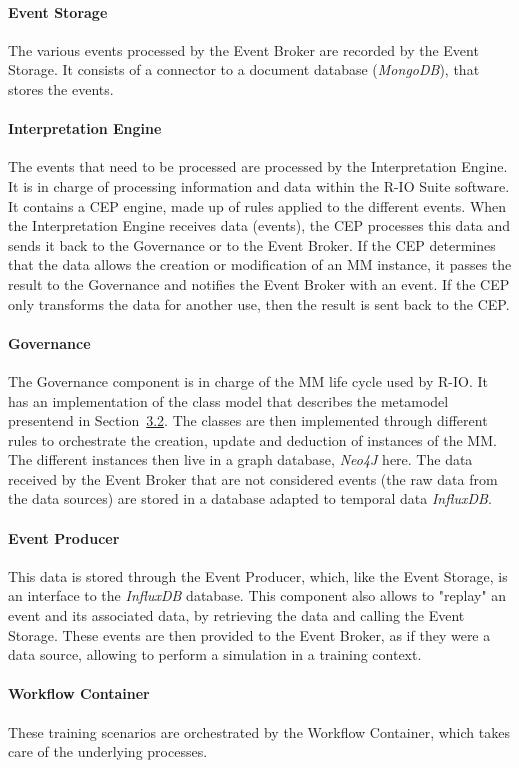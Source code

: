 \paragraph{Event Storage}
The various events processed by the Event Broker are recorded by the Event Storage.
It consists of a connector to a document database (\textit{MongoDB}), that stores the events.
\paragraph{Interpretation Engine}
The events that need to be processed are processed by the Interpretation Engine.
It is in charge of processing information and data within the R-IO Suite software.
It contains a CEP engine, made up of rules applied to the different events.
When the Interpretation Engine receives data (events), the CEP processes this data and sends it back to the Governance or to the Event Broker.
If the CEP determines that the data allows the creation or modification of an MM instance, it passes the result to the Governance and notifies the Event Broker with an event.
If the CEP only transforms the data for another use, then the result is sent back to the CEP.
\paragraph{Governance}
The Governance component is in charge of the MM life cycle used by R-IO.
It has an implementation of the class model that describes the metamodel presentend in Section~\hyperref[sec:crisismetamodel]{3.2}.
The classes are then implemented through different rules to orchestrate the creation, update and deduction of instances of the MM.
The different instances then live in a graph database, \textit{Neo4J} here.
The data received by the Event Broker that are not considered events (the raw data from the data sources) are stored in a database adapted to temporal data \textit{InfluxDB}.
\paragraph{Event Producer}
This data is stored through the Event Producer, which, like the Event Storage, is an interface to the \textit{InfluxDB} database.
This component also allows to "replay" an event and its associated data, by retrieving the data and calling the Event Storage.
These events are then provided to the Event Broker, as if they were a data source, allowing to perform a simulation in a training context.
\paragraph{Workflow Container}
These training scenarios are orchestrated by the Workflow Container, which takes care of the underlying processes.
